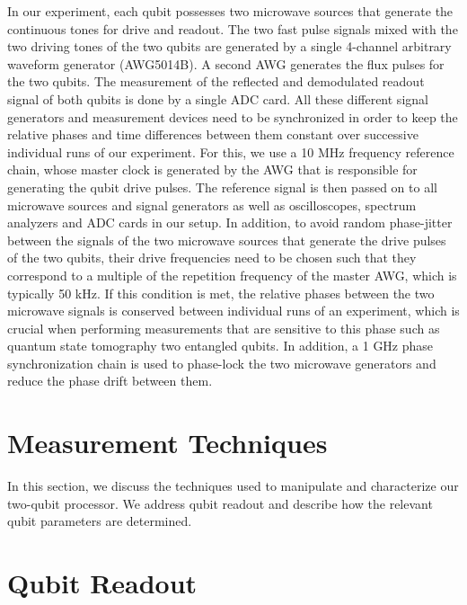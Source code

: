 In our experiment, each qubit possesses two microwave sources that generate the continuous tones for drive and readout. The two fast pulse signals mixed with the two driving tones of the two qubits are generated by a single 4-channel arbitrary waveform generator (AWG5014B). A second AWG generates the flux pulses for the two qubits. The measurement of the reflected and demodulated readout signal of both qubits is done by a single ADC card. All these different signal generators and measurement devices need to be synchronized in order to keep the relative phases and time differences between them constant over successive individual runs of our experiment. For this, we use a 10 MHz frequency reference chain, whose master clock is generated by the AWG that is responsible for generating the qubit drive pulses. The reference signal is then passed on to all microwave sources and signal generators as well as oscilloscopes, spectrum analyzers and ADC cards in our setup. In addition, to avoid random phase-jitter between the signals of the two microwave sources that generate the drive pulses of the two qubits, their drive frequencies need to be chosen such that they correspond to a multiple of the repetition frequency of the master AWG, which is typically 50 kHz. If this condition is met, the relative phases between the two microwave signals is conserved between individual runs of an experiment, which is crucial when performing measurements that are sensitive to this phase such as quantum state tomography two entangled qubits. In addition, a 1 GHz phase synchronization chain is used to phase-lock the two microwave generators and reduce the phase drift between them.

\section{Measurement Techniques}

In this section, we discuss the techniques used to manipulate and characterize our two-qubit processor. We address qubit readout and describe how the relevant qubit parameters are determined.

\section{Qubit Readout} \label{section:qubit_readout}

